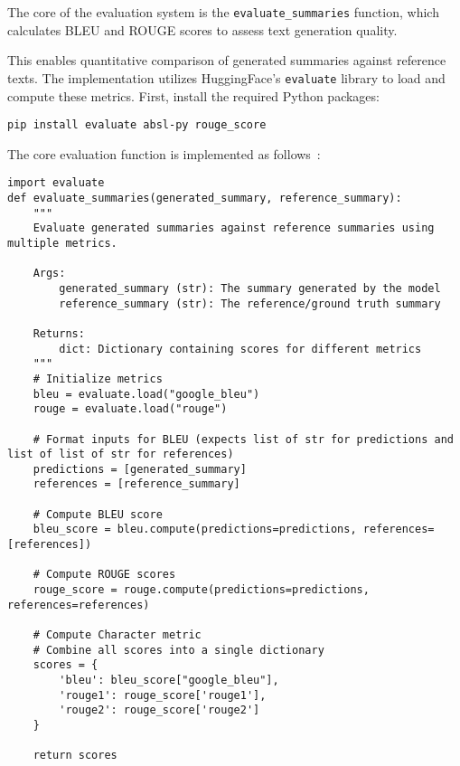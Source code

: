 The core of the evaluation system is the \texttt{evaluate\_summaries} function, which calculates BLEU and ROUGE scores to assess text generation quality.

This enables quantitative comparison of generated summaries against reference texts. The implementation utilizes HuggingFace's \texttt{evaluate} library to load and compute these metrics.
First, install the required Python packages:

\begin{verbatim}
pip install evaluate absl-py rouge_score
\end{verbatim}

The core evaluation function is implemented as follows~:

\begin{verbatim}
import evaluate
def evaluate_summaries(generated_summary, reference_summary):
    """
    Evaluate generated summaries against reference summaries using multiple metrics.
    
    Args:
        generated_summary (str): The summary generated by the model
        reference_summary (str): The reference/ground truth summary
        
    Returns:
        dict: Dictionary containing scores for different metrics
    """
    # Initialize metrics
    bleu = evaluate.load("google_bleu")
    rouge = evaluate.load("rouge")
    
    # Format inputs for BLEU (expects list of str for predictions and list of list of str for references)
    predictions = [generated_summary]
    references = [reference_summary]
    
    # Compute BLEU score
    bleu_score = bleu.compute(predictions=predictions, references=[references])
    
    # Compute ROUGE scores
    rouge_score = rouge.compute(predictions=predictions, references=references)
    
    # Compute Character metric    
    # Combine all scores into a single dictionary
    scores = {
        'bleu': bleu_score["google_bleu"],
        'rouge1': rouge_score['rouge1'],
        'rouge2': rouge_score['rouge2']
    }
    
    return scores
\end{verbatim}

